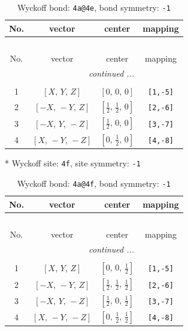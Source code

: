 \documentclass[fleqn,8pt]{jsarticle}
\begin{document}
\begin{longtable}{cccc}
\caption{Wyckoff bond: {\tt 4a@4e}, bond symmetry: {\tt -1}}
 \\
 \hline \hline
No. & vector & center & mapping \\ \hline \endfirsthead

\multicolumn{3}{l}{\tablename\ \thetable{}} \\
 \hline \hline
No. & vector & center & mapping \\ \hline \endhead

 \hline \hline
\multicolumn{3}{r}{\footnotesize\it continued ...} \\ \endfoot

 \hline \hline
\multicolumn{3}{r}{} \\ \endlastfoot

1 & $\left[ X,\, Y,\, Z \right]$ & $\left[ 0,\, 0,\, 0 \right]$ & {\tt [1,-5]} \\ \hline
2 & $\left[ - X,\, - Y,\, Z \right]$ & $\left[ \frac{1}{2},\, \frac{1}{2},\, 0 \right]$ & {\tt [2,-6]} \\ \hline
3 & $\left[ - X,\, Y,\, - Z \right]$ & $\left[ \frac{1}{2},\, 0,\, 0 \right]$ & {\tt [3,-7]} \\ \hline
4 & $\left[ X,\, - Y,\, - Z \right]$ & $\left[ 0,\, \frac{1}{2},\, 0 \right]$ & {\tt [4,-8]} \\
\end{longtable}
* Wyckoff site: {\tt 4f}, site symmetry: {\tt -1}
\renewcommand{\arraystretch}{1.2}
\begin{longtable}{cccc}
\caption{Wyckoff bond: {\tt 4a@4f}, bond symmetry: {\tt -1}}
 \\
 \hline \hline
No. & vector & center & mapping \\ \hline \endfirsthead

\multicolumn{3}{l}{\tablename\ \thetable{}} \\
 \hline \hline
No. & vector & center & mapping \\ \hline \endhead

 \hline \hline
\multicolumn{3}{r}{\footnotesize\it continued ...} \\ \endfoot

 \hline \hline
\multicolumn{3}{r}{} \\ \endlastfoot

1 & $\left[ X,\, Y,\, Z \right]$ & $\left[ 0,\, 0,\, \frac{1}{2} \right]$ & {\tt [1,-5]} \\ \hline
2 & $\left[ - X,\, - Y,\, Z \right]$ & $\left[ \frac{1}{2},\, \frac{1}{2},\, \frac{1}{2} \right]$ & {\tt [2,-6]} \\ \hline
3 & $\left[ - X,\, Y,\, - Z \right]$ & $\left[ \frac{1}{2},\, 0,\, \frac{1}{2} \right]$ & {\tt [3,-7]} \\ \hline
4 & $\left[ X,\, - Y,\, - Z \right]$ & $\left[ 0,\, \frac{1}{2},\, \frac{1}{2} \right]$ & {\tt [4,-8]} \\
\end{longtable}
\end{document}
